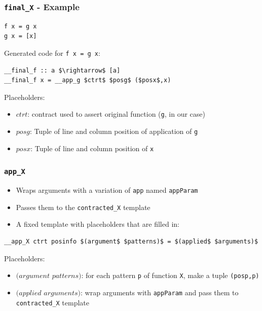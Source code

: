\documentclass[]{beamer}
\begin{document}
\begin{frame}[fragile]
\frametitle{\texttt{\underline{\hspace{1.5em}}final\_X} - Example}

\begin{lstlisting}[mathescape]
f x = g x
g x = [x]
\end{lstlisting}

Generated code for \texttt{f x = g x}:

\begin{lstlisting}[mathescape]
__final_f :: a $\rightarrow$ [a]
__final_f x = __app_g $ctrt$ $posg$ ($posx$,x)
\end{lstlisting}

Placeholders:
\begin{itemize}
	\item $ctrt$: contract used to assert original function (\texttt{g}, in our case)
	\item $posg$: Tuple of line and column position of application of \texttt{g}
	\item $posx$: Tuple of line and column position of  \texttt{x}
\end{itemize}

\end{frame}

\begin{frame}[fragile]
\frametitle{\texttt{\underline{\hspace{1.5em}}app\_X}}

\begin{itemize}
	\item Wraps arguments with a variation of \texttt{app} named \texttt{appParam}
	\item Passes them to the \texttt{\underline{\hspace{1.5em}}contracted\_X} template
	\item A fixed template with placeholders that are filled in:
\end{itemize}

\begin{lstlisting}[mathescape]
__app_X ctrt posinfo $(argument$ $patterns)$ = $(applied$ $arguments)$
\end{lstlisting}

Placeholders:
\begin{itemize}
	\item $(argument$ $patterns)$: for each pattern \texttt{p} of function \texttt{X}, make a tuple \texttt{(posp,p)}
	\item $(applied$ $arguments)$: wrap arguments with \texttt{appParam} and pass them to \texttt{\underline{\hspace{1.5em}}contracted\_X} template
\end{itemize}

\end{frame}
\end{document}
